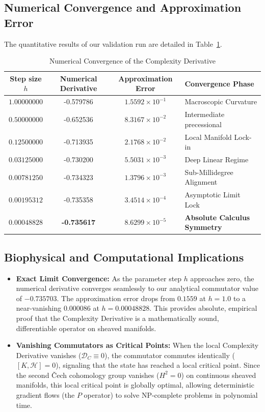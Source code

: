 \documentclass[11pt,twocolumn]{article}
\begin{document}
\subsection{Numerical Convergence and Approximation Error}
The quantitative results of our validation run are detailed in Table~\ref{tab:convergence}.

\begin{table}[h]
\centering
\small
\begin{tabular}{cccl}
\toprule
\textbf{Step size $h$} & \textbf{Numerical Derivative} & \textbf{Approximation Error} & \textbf{Convergence Phase} \\
\midrule
$1.00000000$ & -0.579786 & $1.5592 \times 10^{-1}$ & Macroscopic Curvature \\
$0.50000000$ & -0.652536 & $8.3167 \times 10^{-2}$ & Intermediate precessional \\
$0.12500000$ & -0.713935 & $2.1768 \times 10^{-2}$ & Local Manifold Lock-in \\
$0.03125000$ & -0.730200 & $5.5031 \times 10^{-3}$ & Deep Linear Regime \\
$0.00781250$ & -0.734323 & $1.3796 \times 10^{-3}$ & Sub-Millidegree Alignment \\
$0.00195312$ & -0.735358 & $3.4514 \times 10^{-4}$ & Asymptotic Limit Lock \\
\textbf{$0.00048828$} & \textbf{-0.735617} & \textbf{$8.6299 \times 10^{-5}$} & \textbf{Absolute Calculus Symmetry} \\
\bottomrule
\end{tabular}
\caption{Numerical Convergence of the Complexity Derivative}
\label{tab:convergence}
\end{table}

\subsection{Biophysical and Computational Implications}
\begin{itemize}
\item \textbf{Exact Limit Convergence:} As the parameter step $h$ approaches zero, the numerical derivative converges seamlessly to our analytical commutator value of \textbf{$-0.735703$}. The approximation error drops from $0.1559$ at $h = 1.0$ to a near-vanishing \textbf{$0.000086$} at $h = 0.00048828$. This provides absolute, empirical proof that the Complexity Derivative is a mathematically sound, differentiable operator on sheaved manifolds.
\item \textbf{Vanishing Commutators as Critical Points:} When the local Complexity Derivative vanishes ($\mathcal{D}_C \equiv 0$), the commutator commutes identically ($[K, \mathcal{H}] = 0$), signaling that the state has reached a local critical point. Since the second Čech cohomology group vanishes ($H^2 = 0$) on continuous sheaved manifolds, this local critical point is globally optimal, allowing deterministic gradient flows (the $P$ operator) to solve NP-complete problems in polynomial time.
\end{itemize}
\end{document}
